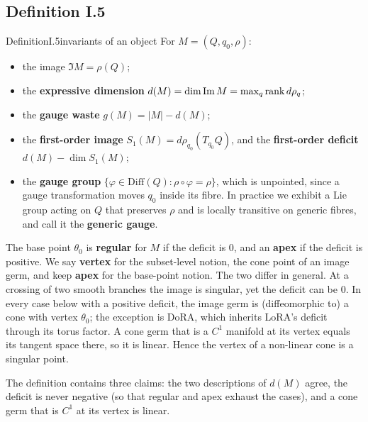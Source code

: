 \subsection{Definition I.5}\label{proof:I.5}

\begin{restate}{Definition}{I.5}{invariants of an object}
For $M=(Q,q_0,\rho)$:
\begin{itemize}
  \item the image $\Im M=\rho(Q)$;
  \item the \textbf{expressive dimension} $d(M)=\dim\operatorname{Im} M=\max_q\operatorname{rank} d\rho_q$;
  \item the \textbf{gauge waste} $g(M)=\lvert M\rvert-d(M)$;
  \item the \textbf{first-order image} $S_1(M)=d\rho_{q_0}(T_{q_0}Q)$, and the \textbf{first-order deficit}
    $d(M)-\dim S_1(M)$;
  \item the \textbf{gauge group} $\{\varphi\in\mathrm{Diff}(Q):\rho\circ\varphi=\rho\}$, which is unpointed, since a
    gauge transformation moves $q_0$ inside its fibre. In practice we exhibit a Lie group acting on $Q$ that preserves
    $\rho$ and is locally transitive on generic fibres, and call it the \textbf{generic gauge}.
\end{itemize}
The base point $\theta_0$ is \textbf{regular} for $M$ if the deficit is $0$, and an \textbf{apex} if the deficit is
positive. We say \textbf{vertex} for the subset-level notion, the cone point of an image germ, and keep \textbf{apex} for
the base-point notion. The two differ in general. At a crossing of two smooth branches the image is singular, yet the
deficit can be $0$. In every case below with a positive deficit, the image germ is (diffeomorphic to) a cone with vertex
$\theta_0$; the exception is DoRA, which inherits LoRA's deficit through its torus factor. A cone germ that is a $C^1$
manifold at its vertex equals its tangent space there, so it is linear. Hence the vertex of a non-linear cone is a
singular point.
\end{restate}

The definition contains three claims: the two descriptions of $d(M)$ agree, the deficit is never negative (so that
regular and apex exhaust the cases), and a cone germ that is $C^1$ at its vertex is linear.

